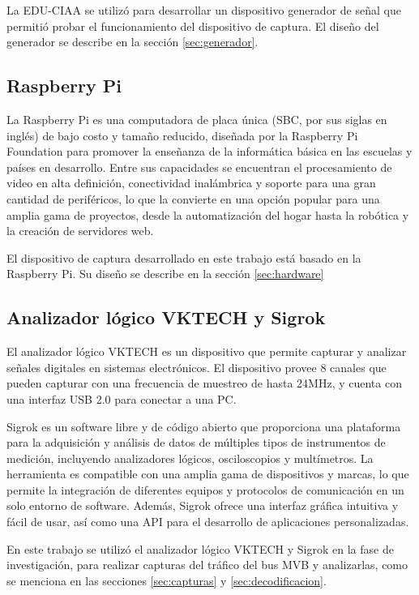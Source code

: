 La EDU-CIAA se utilizó para desarrollar un dispositivo generador de señal que permitió probar el funcionamiento del dispositivo de captura. El diseño del generador se describe en la sección \ref{sec:generador}.

\subsection{Raspberry Pi}

La Raspberry Pi \cite{web:rpi} es una computadora de placa única (SBC, por sus siglas en inglés) de bajo costo y tamaño reducido, diseñada por la Raspberry Pi Foundation para promover la enseñanza de la informática básica en las escuelas y países en desarrollo.
Entre sus capacidades se encuentran el procesamiento de video en alta definición, conectividad inalámbrica y soporte para una gran cantidad de periféricos, lo que la convierte en una opción popular para una amplia gama de proyectos, desde la automatización del hogar hasta la robótica y la creación de servidores web.

El dispositivo de captura desarrollado en este trabajo está basado en la Raspberry Pi. Su diseño se describe en la sección \ref{sec:hardware}

\subsection{Analizador lógico VKTECH y Sigrok}

El analizador lógico VKTECH \cite{vktech} es un dispositivo que permite capturar y analizar señales digitales en sistemas electrónicos. El dispositivo provee 8 canales que pueden capturar con una frecuencia de muestreo de hasta 24MHz, y cuenta con una interfaz USB 2.0 para conectar a una PC.

Sigrok \cite{sigrok} es un software libre y de código abierto que proporciona una plataforma para la adquisición y análisis de datos de múltiples tipos de instrumentos de medición, incluyendo analizadores lógicos, osciloscopios y multímetros. La herramienta es compatible con una amplia gama de dispositivos y marcas, lo que permite la integración de diferentes equipos y protocolos de comunicación en un solo entorno de software. Además, Sigrok ofrece una interfaz gráfica intuitiva y fácil de usar, así como una API para el desarrollo de aplicaciones personalizadas.

En este trabajo se utilizó el analizador lógico VKTECH y Sigrok en la fase de investigación, para realizar capturas del tráfico del bus MVB y analizarlas, como se menciona en las secciones \ref{sec:capturas} y \ref{sec:decodificacion}.

